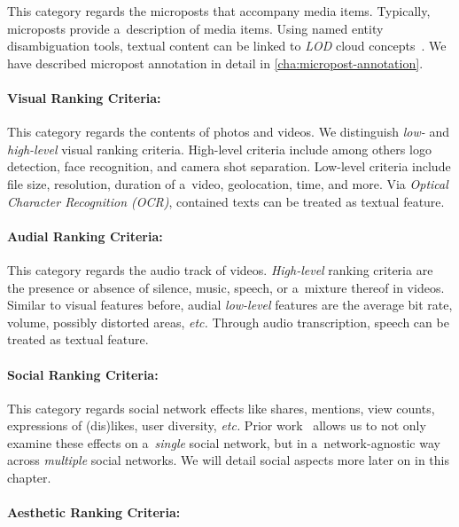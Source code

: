 This category regards the microposts that accompany media items.
Typically, microposts provide a~description of media items.
Using named entity disambiguation tools,
textual content can be linked to \emph{LOD} cloud concepts~\cite{steiner2011addingmeaning}.
We have described micropost annotation in detail in \autoref{cha:micropost-annotation}.

\paragraph{Visual Ranking Criteria:} \label{sec:visualrankingcriteria}

This category regards the contents of photos and videos.
We distinguish \emph{low-} and \emph{high-level} visual ranking criteria.
High-level criteria include among others logo detection,
face recognition, and camera shot separation.
Low-level criteria include file size, resolution,
duration of a~video, geolocation, time, and more.
Via \emph{Optical Character Recognition (OCR)}, contained texts can be treated as textual feature.

\paragraph{Audial Ranking Criteria:}

This category regards the audio track of videos.
\emph{High-level} ranking criteria are the presence or absence
of silence, music, speech, or a~mixture thereof in videos.
Similar to visual features before,
audial \emph{low-level} features are the average bit rate,
volume, possibly distorted areas, \emph{etc.}
Through audio transcription, speech can be treated as textual feature.

\paragraph{Social Ranking Criteria:}

This category regards social network effects like shares, mentions,
view counts, expressions of (dis)likes, user diversity, \emph{etc.}
Prior work~\cite{khrouf2012aggregatingsocialmedia}
allows us to not only examine these effects
on a~\emph{single} social network,
but in a~network-agnostic way across \emph{multiple} social networks.
We will detail social aspects more later on in this chapter.

\paragraph{Aesthetic Ranking Criteria:}

